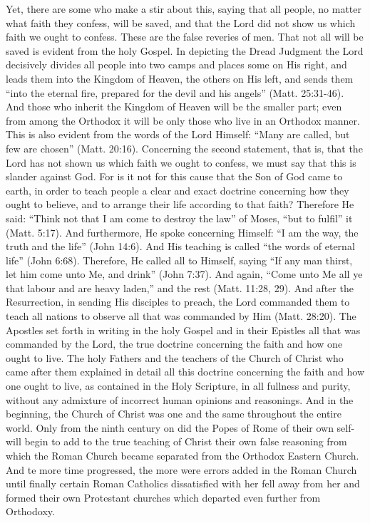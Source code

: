 Yet, there are some who make a stir about this, saying that all people, no matter what faith they confess, will be saved, and that the Lord did not show us which faith we ought to confess. These are the false reveries of men. That not all will be saved is evident from the holy Gospel. In depicting the Dread Judgment the Lord decisively divides all people into two camps and places some on His right, and leads them into the Kingdom of Heaven, the others on His left, and sends them ``into the eternal fire, prepared for the devil and his angels'' (Matt. 25:31-46). And those who inherit the Kingdom of Heaven will be the smaller part; even from among the Orthodox it will be only those who live in an Orthodox manner. This is also evident from the words of the Lord Himself: ``Many are called, but few are chosen'' (Matt. 20:16). Concerning the second statement, that is, that the Lord has not shown us which faith we ought to confess, we must say that this is slander against God. For is it not for this cause that the Son of God came to earth, in order to teach people a clear and exact doctrine concerning how they ought to believe, and to arrange their life according to that faith? Therefore He said: ``Think not that I am come to destroy the law'' of Moses, ``but to fulfil'' it (Matt. 5:17). And furthermore, He spoke concerning Himself: ``I am the way, the truth and the life'' (John 14:6). And His teaching is called ``the words of eternal life'' (John 6:68). Therefore, He called all to Himself, saying ``If any man thirst, let him come unto Me, and drink'' (John 7:37). And again, ``Come unto Me all ye that labour and are heavy laden,'' and the rest (Matt. 11:28, 29). And after the Resurrection, in sending His disciples to preach, the Lord commanded them to teach all nations to observe all that was commanded by Him (Matt. 28:20). The Apostles set forth in writing in the holy Gospel and in their Epistles all that was commanded by the Lord, the true doctrine concerning the faith and how one ought to live. The holy Fathers and the teachers of the Church of Christ who came after them explained in detail all this doctrine concerning the faith and how one ought to live, as contained in the Holy Scripture, in all fullness and purity, without any admixture of incorrect human opinions and reasonings. And in the beginning, the Church of Christ was one and the same throughout the entire world. Only from the ninth century on did the Popes of Rome of their own self-will begin to add to the true teaching of Christ their own false reasoning from which the Roman Church became separated from the Orthodox Eastern Church. And te more time progressed, the more were errors added in the Roman Church until finally certain Roman Catholics dissatisfied with her fell away from her and formed their own Protestant churches which departed even further from Orthodoxy.

